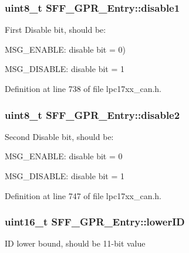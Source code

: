 \hypertarget{struct_s_f_f___g_p_r___entry_af011b69c1031f768f0133a53cb0e90f1}{
\subsubsection[{disable1}]{\setlength{\rightskip}{0pt plus 5cm}uint8\-\_\-t {\bf \-S\-F\-F\-\_\-\-G\-P\-R\-\_\-\-Entry\-::disable1}}}\label{struct_s_f_f___g_p_r___entry_af011b69c1031f768f0133a53cb0e90f1}
\-First \-Disable bit, should be\-:
\begin{DoxyItemize}
\item \-M\-S\-G\-\_\-\-E\-N\-A\-B\-L\-E\-: disable bit = 0)
\item \-M\-S\-G\-\_\-\-D\-I\-S\-A\-B\-L\-E\-: disable bit = 1 
\end{DoxyItemize}

\-Definition at line 738 of file lpc17xx\-\_\-can.\-h.

\hypertarget{struct_s_f_f___g_p_r___entry_af9be712f7455759474a4687001da2604}{
\subsubsection[{disable2}]{\setlength{\rightskip}{0pt plus 5cm}uint8\-\_\-t {\bf \-S\-F\-F\-\_\-\-G\-P\-R\-\_\-\-Entry\-::disable2}}}\label{struct_s_f_f___g_p_r___entry_af9be712f7455759474a4687001da2604}
\-Second \-Disable bit, should be\-:
\begin{DoxyItemize}
\item \-M\-S\-G\-\_\-\-E\-N\-A\-B\-L\-E\-: disable bit = 0
\item \-M\-S\-G\-\_\-\-D\-I\-S\-A\-B\-L\-E\-: disable bit = 1 
\end{DoxyItemize}

\-Definition at line 747 of file lpc17xx\-\_\-can.\-h.

\hypertarget{struct_s_f_f___g_p_r___entry_ab22386a244c94c4025b84c8bb56e1e8f}{
\subsubsection[{lower\-I\-D}]{\setlength{\rightskip}{0pt plus 5cm}uint16\-\_\-t {\bf \-S\-F\-F\-\_\-\-G\-P\-R\-\_\-\-Entry\-::lower\-I\-D}}}\label{struct_s_f_f___g_p_r___entry_ab22386a244c94c4025b84c8bb56e1e8f}
\-I\-D lower bound, should be 11-\/bit value 

